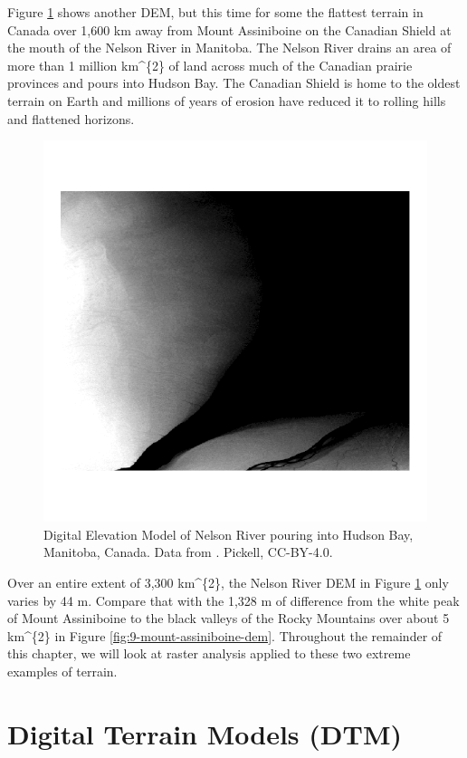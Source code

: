 \documentclass[
]{book}
\begin{document}
Figure \ref{fig:9-nelson-river-dem} shows another DEM, but this time for some the flattest terrain in Canada over 1,600 km away from Mount Assiniboine on the Canadian Shield at the mouth of the Nelson River in Manitoba. The Nelson River drains an area of more than 1 million km\^{}\{2\} of land across much of the Canadian prairie provinces and pours into Hudson Bay. The Canadian Shield is home to the oldest terrain on Earth and millions of years of erosion have reduced it to rolling hills and flattened horizons.



\begin{figure}
\includegraphics[width=0.75\linewidth]{images/09-nelson-river-dem} \caption{Digital Elevation Model of Nelson River pouring into Hudson Bay, Manitoba, Canada. Data from \citep{earth_resources_observation_and_science_center_usgs_2018}. Pickell, CC-BY-4.0.}\label{fig:9-nelson-river-dem}
\end{figure}

Over an entire extent of 3,300 km\^{}\{2\}, the Nelson River DEM in Figure \ref{fig:9-nelson-river-dem} only varies by 44 m. Compare that with the 1,328 m of difference from the white peak of Mount Assiniboine to the black valleys of the Rocky Mountains over about 5 km\^{}\{2\} in Figure \ref{fig:9-mount-assiniboine-dem}. Throughout the remainder of this chapter, we will look at raster analysis applied to these two extreme examples of terrain.

\section{Digital Terrain Models (DTM)}\label{digital-terrain-models-dtm}
\end{document}
